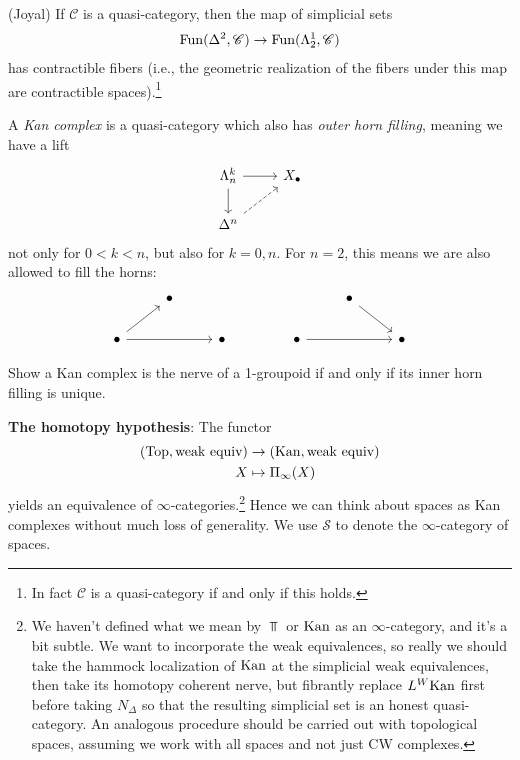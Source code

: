 \documentclass[11pt,openany]{book}
\begin{document}
\begin{proposition} (Joyal) If $\mathscr{C}$ is a quasi-category, then the map of simplicial sets
\begin{align*}
    \mathrm{Fun}(\Delta^2,\mathscr{C})\to \mathrm{Fun}(\Lambda_2^1,\mathscr{C})
\end{align*}
has contractible fibers (i.e., the geometric realization of the fibers under this map are contractible spaces).\footnote{In fact $\mathscr{C}$ is a quasi-category if and only if this holds.}

\end{proposition}





\begin{definition} A \textit{Kan complex} is a quasi-category which also has \textit{outer horn filling}, meaning we have a lift
\[ \begin{tikzcd}
    \Lambda^k_n\rar\dar & X_\bullet\\
    \Delta^n\ar[ur,dashed] & 
\end{tikzcd} \]
not only for $0<k<n$, but also for $k=0,n$. For $n=2$, this means we are also allowed to fill the horns:
\[ \begin{tikzcd}
     & \bullet\\
    \bullet\ar[ur]\ar[rr] & & \bullet
\end{tikzcd} \quad\quad \quad\quad  \begin{tikzcd}
    & \bullet\ar[dr] & \\
    \bullet\ar[rr] & & \bullet
\end{tikzcd} \]
\end{definition}



\begin{exercise} Show a Kan complex is the nerve of a 1-groupoid if and only if its inner horn filling is unique.
\end{exercise}

\textbf{The homotopy hypothesis}: The functor
\begin{align*}
    (\mathrm{Top},\text{weak equiv}) &\to (\mathrm{Kan}, \text{weak equiv}) \\
    X &\mapsto \Pi_\infty(X)
\end{align*}
yields an equivalence of $\infty$-categories.\footnote{%
We haven't defined what we mean by $\Top$ or $\mathrm{Kan}$ as an $\infty$-category, and it's a bit subtle. We want to incorporate the weak equivalences, so really we should take the hammock localization of $\mathrm{Kan}$ at the simplicial weak equivalences, then take its homotopy coherent nerve, but fibrantly replace $L^W\mathrm{Kan}$ first before taking $N_\Delta$ so that the resulting simplicial set is an honest quasi-category. An analogous procedure should be carried out with topological spaces, assuming we work with all spaces and not just CW complexes.
}
Hence we can think about spaces as Kan complexes without much loss of generality. We use $\mathcal{S}$ to denote the $\infty$-category of spaces.
\end{document}
